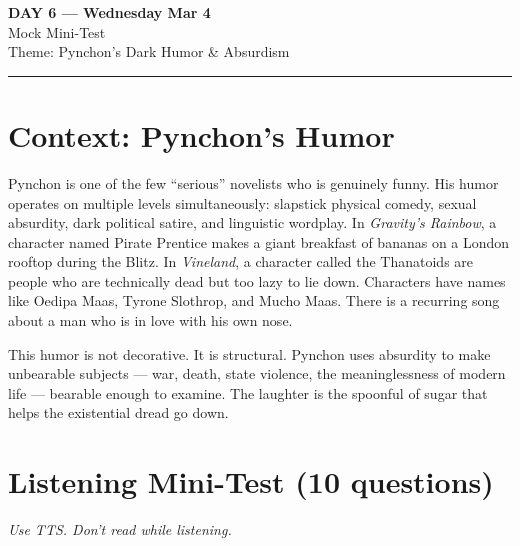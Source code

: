 \documentclass[10pt,a4paper]{article}
\begin{document}
\begin{center}
{\LARGE \textbf{DAY 6 --- Wednesday Mar 4}}\\[4pt]
{\large Mock Mini-Test}\\[2pt]
{\normalsize Theme: Pynchon's Dark Humor \& Absurdism}\\[2pt]
\rule{\textwidth}{0.8pt}
\end{center}

\section*{Context: Pynchon's Humor}

\begin{tcolorbox}[colback=white, colframe=black]
\small
Pynchon is one of the few ``serious'' novelists who is genuinely
funny. His humor operates on multiple levels simultaneously: slapstick
physical comedy, sexual absurdity, dark political satire, and
linguistic wordplay. In \emph{Gravity's Rainbow}, a character named
Pirate Prentice makes a giant breakfast of bananas on a London
rooftop during the Blitz. In \emph{Vineland}, a character called
the Thanatoids are people who are technically dead but too lazy to
lie down. Characters have names like Oedipa Maas, Tyrone Slothrop,
and Mucho Maas. There is a recurring song about a man who is in
love with his own nose.

This humor is not decorative. It is structural. Pynchon uses
absurdity to make unbearable subjects --- war, death, state violence,
the meaninglessness of modern life --- bearable enough to examine.
The laughter is the spoonful of sugar that helps the existential
dread go down.
\end{tcolorbox}

\section*{Listening Mini-Test (10 questions)}

{\small\textit{Use TTS. Don't read while listening.}}
\end{document}
